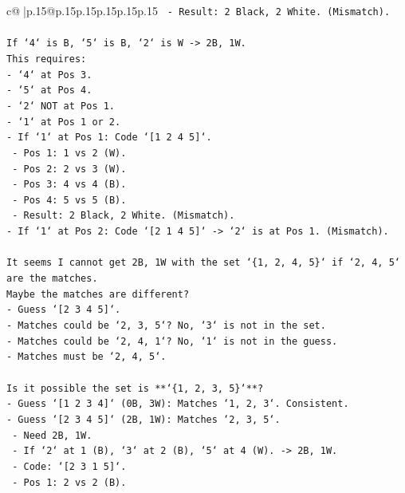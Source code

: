 \documentclass{article}
\begin{document}
{\begin{supertabular}{c@{$\;$}|p{.15\linewidth}@{}p{.15\linewidth}p{.15\linewidth}p{.15\linewidth}p{.15\linewidth}p{.15\linewidth}}
{{{\texttt{    {-} Result: 2 Black, 2 White. (Mismatch).} \\
\\ 
\texttt{If `4` is B, `5` is B, `2` is W {-}> 2B, 1W.} \\
\texttt{This requires:} \\
\texttt{{-} `4` at Pos 3.} \\
\texttt{{-} `5` at Pos 4.} \\
\texttt{{-} `2` NOT at Pos 1.} \\
\texttt{{-} `1` at Pos 1 or 2.} \\
\texttt{{-} If `1` at Pos 1: Code `{[}1 2 4 5{]}`.} \\
\texttt{    {-} Pos 1: 1 vs 2 (W).} \\
\texttt{    {-} Pos 2: 2 vs 3 (W).} \\
\texttt{    {-} Pos 3: 4 vs 4 (B).} \\
\texttt{    {-} Pos 4: 5 vs 5 (B).} \\
\texttt{    {-} Result: 2 Black, 2 White. (Mismatch).} \\
\texttt{{-} If `1` at Pos 2: Code `{[}2 1 4 5{]}` {-}> `2` is at Pos 1. (Mismatch).} \\
\\ 
\texttt{It seems I cannot get 2B, 1W with the set `\{1, 2, 4, 5\}` if `2, 4, 5` are the matches.} \\
\texttt{Maybe the matches are different?} \\
\texttt{{-} Guess `{[}2 3 4 5{]}`.} \\
\texttt{{-} Matches could be `2, 3, 5`? No, `3` is not in the set.} \\
\texttt{{-} Matches could be `2, 4, 1`? No, `1` is not in the guess.} \\
\texttt{{-} Matches must be `2, 4, 5`.} \\
\\ 
\texttt{Is it possible the set is **`\{1, 2, 3, 5\}`**?} \\
\texttt{{-} Guess `{[}1 2 3 4{]}` (0B, 3W): Matches `1, 2, 3`. Consistent.} \\
\texttt{{-} Guess `{[}2 3 4 5{]}` (2B, 1W): Matches `2, 3, 5`.} \\
\texttt{    {-} Need 2B, 1W.} \\
\texttt{    {-} If `2` at 1 (B), `3` at 2 (B), `5` at 4 (W). {-}> 2B, 1W.} \\
\texttt{    {-} Code: `{[}2 3 1 5{]}`.} \\
\texttt{        {-} Pos 1: 2 vs 2 (B).} \\
}}}
\end{supertabular}}
\end{document}
